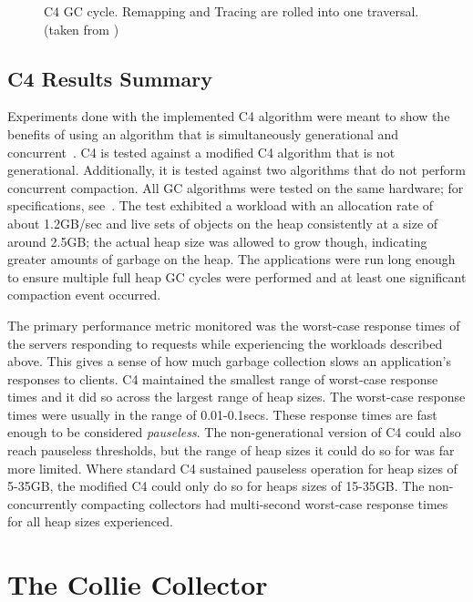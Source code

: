 \documentclass{sig-alternate}
\begin{document}

\begin{figure}
\centering
{}
\caption{C4 GC cycle. Remapping and Tracing are rolled into one traversal.
(taken from \cite{Tene:C4})}
\label{fig:c4Cycle}
\end{figure}


\subsection{C4 Results Summary}
\label{sec:c4Results}

Experiments done with the implemented C4 algorithm were meant to show the
benefits of using an algorithm that is simultaneously generational and concurrent~\cite{Tene:C4}.
C4 is tested against a modified C4 algorithm that is not generational. Additionally,
it is tested against two algorithms that do not perform concurrent compaction. 
All GC algorithms were tested on the same hardware; for specifications, see~\cite{Tene:C4}. The test exhibited
a workload with
an allocation rate of about 1.2GB/sec and live sets of objects on 
the heap consistently at a size of around 2.5GB; the actual heap size was allowed 
to grow though, indicating greater amounts of garbage on the heap. The applications were run long
enough to ensure multiple full heap GC cycles were performed and at least one
significant compaction event occurred.

The primary performance metric monitored was the worst-case response times
of the servers responding to requests while experiencing the workloads
described above. This gives a sense of how much garbage collection slows
an application's responses to clients. C4 maintained the smallest 
range of worst-case response times and it did so across the largest range of heap sizes.
The worst-case response times were usually in the range of 0.01-0.1secs. 
These response times are fast enough to be considered \emph{pauseless}. 
The non-generational version of C4 could also reach pauseless thresholds,
but the range of heap sizes it could do so for was far more limited. Where standard
C4 sustained pauseless operation for heap sizes of 5-35GB, the modified C4 could
only do so for heaps sizes of 15-35GB. The non-concurrently compacting
collectors had multi-second worst-case response times for all heap sizes experienced.


\section{The Collie Collector}
\label{sec:collie}
\end{document}
